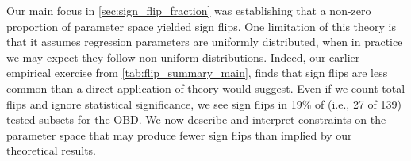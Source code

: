 Our main focus in \cref{sec:sign_flip_fraction} was establishing that a non-zero proportion of parameter
space yielded sign flips.
One limitation of this theory is that it assumes regression parameters are uniformly distributed, when in practice we may expect they follow non-uniform distributions.
Indeed, our earlier empirical exercise from \cref{tab:flip_summary_main}, finds that sign flips are less common than a direct application of theory would suggest. 
Even if we count total flips and ignore statistical significance, we see sign flips in 19\% of (i.e., 27 of 139) tested subsets for the OBD.
We now describe and interpret constraints on the parameter space that may produce fewer sign flips than implied by our theoretical results.



